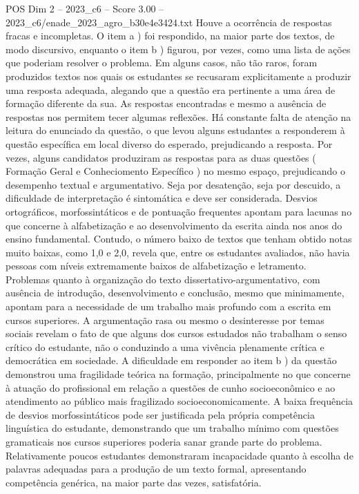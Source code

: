 \begin{textsample}{POS Dim 2 – 2023\_c6 – Score 3.00 – 2023\_c6/enade\_2023\_agro\_b30e4e3424.txt}
Houve a ocorrência de respostas fracas e incompletas.
O item a ) foi respondido, na maior parte dos textos, de modo discursivo, enquanto o item b ) figurou, por vezes, como uma lista de ações que poderiam resolver o problema.
Em alguns casos, não tão raros, foram produzidos textos nos quais os estudantes se recusaram explicitamente a produzir uma resposta adequada, alegando que a questão era pertinente a uma área de formação diferente da sua.
As respostas encontradas e mesmo a ausência de respostas nos permitem tecer algumas reflexões.
Há constante falta de atenção na leitura do enunciado da questão, o que levou alguns estudantes a responderem à questão específica em local diverso do esperado, prejudicando a resposta.
Por vezes, alguns candidatos produziram as respostas para as duas questões ( Formação Geral e Conheciomento Específico ) no mesmo espaço, prejudicando o desempenho textual e argumentativo.
Seja por desatenção, seja por descuido, a dificuldade de interpretação é sintomática e deve ser considerada.
Desvios ortográficos, morfossintáticos e de pontuação frequentes apontam para lacunas no que concerne à alfabetização e ao desenvolvimento da escrita ainda nos anos do ensino fundamental.
Contudo, o número baixo de textos que tenham obtido notas muito baixas, como 1,0 e 2,0, revela que, entre os estudantes avaliados, não havia pessoas com níveis extremamente baixos de alfabetização e letramento.
Problemas quanto à organização do texto dissertativo-argumentativo, com ausência de introdução, desenvolvimento e conclusão, mesmo que minimamente, apontam para a necessidade de um trabalho mais profundo com a escrita em cursos superiores.
A argumentação rasa ou mesmo o desinteresse por temas sociais revelam o fato de que alguns dos cursos estudados não trabalham o senso crítico do estudante, não o conduzindo a uma vivência plenamente crítica e democrática em sociedade.
A dificuldade em responder ao item b ) da questão demonstrou uma fragilidade teórica na formação, principalmente no que concerne à atuação do profissional em relação a questões de cunho socioeconômico e ao atendimento ao público mais fragilizado socioeconomicamente.
A baixa frequência de desvios morfossintáticos pode ser justificada pela própria competência linguística do estudante, demonstrando que um trabalho mínimo com questões gramaticais nos cursos superiores poderia sanar grande parte do problema.
Relativamente poucos estudantes demonstraram incapacidade quanto à escolha de palavras adequadas para a produção de um texto formal, apresentando competência genérica, na maior parte das vezes, satisfatória.

\end{textsample}

